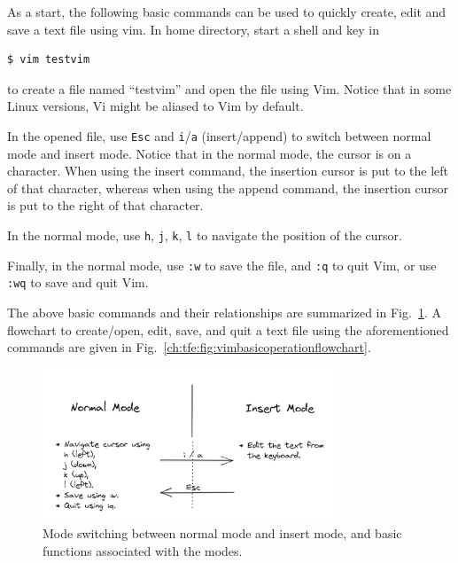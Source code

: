 As a start, the following basic commands can be used to quickly create, edit and save a text file using vim. In home directory, start a shell and key in
\begin{lstlisting}
$ vim testvim
\end{lstlisting}
to create a file named ``testvim'' and open the file using Vim. Notice that in some Linux versions, Vi might be aliased to Vim by default.

In the opened file, use \verb|Esc| and \verb|i|/\verb|a| (insert/append) to switch between normal mode and insert mode. Notice that in the normal mode, the cursor is on a character. When using the insert command, the insertion cursor is put to the left of that character, whereas when using the append command, the insertion cursor is put to the right of that character. 

In the normal mode, use \verb|h|, \verb|j|, \verb|k|, \verb|l| to navigate the position of the cursor. 

Finally, in the normal mode, use \verb|:w| to save the file, and \verb|:q| to quit Vim, or use \verb|:wq| to save and quit Vim.

The above basic commands and their relationships are summarized in Fig.~\ref{ch:tfe:fig:vimbasicmodeswitching}. A flowchart to create/open, edit, save, and quit a text file using the aforementioned commands are given in Fig.~\ref{ch:tfe:fig:vimbasicoperationflowchart}.

\begin{figure}[htbp]
\centering
\includegraphics[width=250pt]{chapters/part-1/figures/vimbasicmodeswitching.png}
\caption{Mode switching between normal mode and insert mode, and basic functions associated with the modes.} \label{ch:tfe:fig:vimbasicmodeswitching}
\end{figure}

